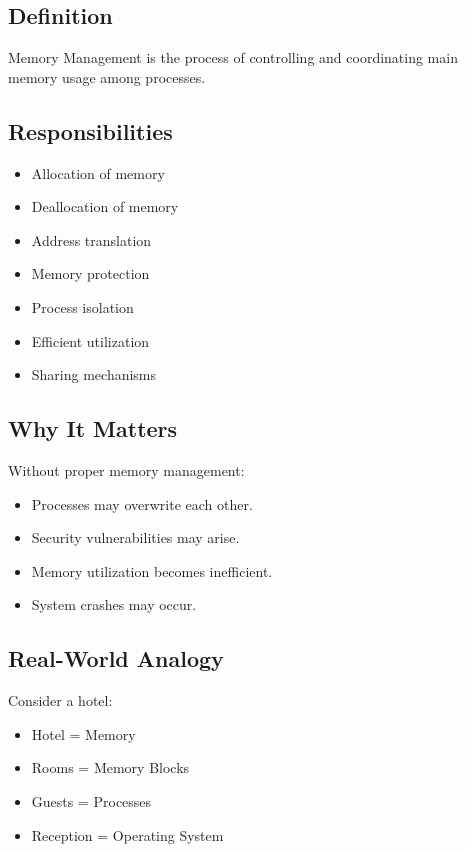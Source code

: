 \subsection{Definition}

Memory Management is the process of controlling and coordinating main memory usage among processes.

\subsection{Responsibilities}

\begin{itemize}
\item Allocation of memory
\item Deallocation of memory
\item Address translation
\item Memory protection
\item Process isolation
\item Efficient utilization
\item Sharing mechanisms
\end{itemize}

\subsection{Why It Matters}

Without proper memory management:

\begin{itemize}
\item Processes may overwrite each other.
\item Security vulnerabilities may arise.
\item Memory utilization becomes inefficient.
\item System crashes may occur.
\end{itemize}

\subsection{Real-World Analogy}

Consider a hotel:

\begin{itemize}
\item Hotel = Memory
\item Rooms = Memory Blocks
\item Guests = Processes
\item Reception = Operating System
\end{itemize}

